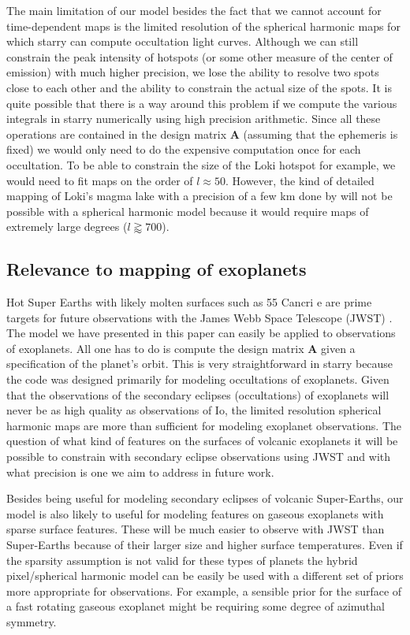 \documentclass[modern]{aastex62}
\begin{document}
The main limitation of our model besides the fact that we cannot account for time-dependent maps is the limited resolution of the spherical harmonic maps for which \textsf{starry} can compute occultation light curves.
Although we can still constrain the peak intensity of hotspots (or some other measure of the center of emission) with much higher precision, we lose the ability to resolve two spots close to each other and the ability to constrain the actual size of the spots. 
It is quite possible that there is a way around this problem if we compute the various integrals in \textsf{starry} numerically using high precision arithmetic.
Since all these operations are contained in the design matrix $\mathbf{A}$ (assuming that the ephemeris is fixed) we would only need to do the expensive computation once for each occultation.
To be able to constrain the size of the Loki hotspot for example, we would need to fit maps on the order of $l\approx 50$.
However, the kind of detailed mapping of Loki's magma lake with a precision of a few km done by \cite{dekleer2017} will not be possible with a spherical harmonic model because it would require maps of extremely large degrees ($l\gtrapprox 700$).

\subsection{Relevance to mapping of exoplanets} 
\label{ssec:discussion_exoplanets}
Hot Super Earths with likely molten surfaces such as 55 Cancri e are prime targets for future observations with the James Webb Space Telescope (JWST) \citep{samuel2014,henning2018}.
The model we have presented in this paper can easily be applied to observations of exoplanets.
All one has to do is compute the design matrix $\mathbf{A}$ given a specification of the planet's orbit.
This is very straightforward in \textsf{starry} because the code was designed primarily for modeling occultations of exoplanets.
Given that the observations of the secondary eclipses (occultations) of exoplanets will never be as high quality as observations of Io, the limited resolution spherical harmonic maps are more than sufficient for modeling exoplanet observations.
The question of what kind of features on the surfaces of volcanic exoplanets it will be possible to constrain with secondary eclipse observations using JWST and with what precision is one we aim to address in future work.

Besides being useful for modeling secondary eclipses of volcanic Super-Earths, our model is also likely to useful for modeling features on gaseous exoplanets with sparse surface features.
These will be much easier to observe with JWST  than Super-Earths because of their larger size and higher surface temperatures.
Even if the sparsity assumption is not valid for these types of planets the hybrid pixel/spherical harmonic model can be easily be used with a different set of priors more appropriate for observations.
For example, a sensible prior for the surface of a fast rotating gaseous exoplanet might be requiring some degree of azimuthal symmetry.
\end{document}

